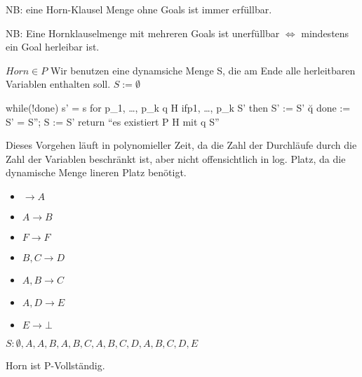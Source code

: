 NB: eine Horn-Klausel Menge ohne Goals ist immer erfüllbar.

NB: Eine Hornklauselmenge mit mehreren Goals ist unerfüllbar
$\Leftrightarrow$ mindestens ein Goal herleibar ist.

\begin{satz}
$Horn \in P$ Wir benutzen eine dynamsiche Menge S, die am Ende alle
herleitbaren Variablen enthalten soll. $S:=\emptyset$
\end{satz}

\begin{codebox}[javascript]
while(!done)
  s' =  s
  for p_1, \dots, p_k  \rightarrow q \in H
    if{p1, \dots, p_k} \seteq S' then
      S' := S' \u {q}
    done := S' = S''; S := S' 
return ``es existiert P \rightarrow \bot \in H mit q \subseteq S''
\end{codebox}

Dieses Vorgehen läuft in polynomieller Zeit, da die Zahl der
Durchläufe durch die Zahl der Variablen beschränkt ist, aber nicht
offensichtlich in log. Platz, da die dynamische Menge lineren Platz
benötigt.

\begin{beispiel}
\begin{itemize}
\item $ \rightarrow A $
\item $ A \rightarrow B $
\item $ F\rightarrow F $
\item $ B,C \rightarrow D $
\item $ A,B \rightarrow C $
\item $ A,D \rightarrow E $
\item $ E\rightarrow \bot $
\end{itemize}
$S:\emptyset ,{A},{A,B},{A,B,C},{A,B,C,D},{A,B,C,D,E}$
\end{beispiel}

\begin{satz}
Horn ist P-Vollständig.
\end{satz}


